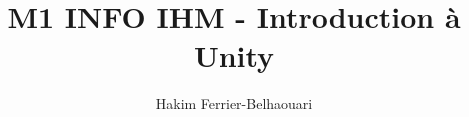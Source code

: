 \documentclass[11pt]{beamer}
\begin{document}
	\author{Hakim Ferrier-Belhaouari}
	\title{M1 INFO IHM - Introduction à Unity}
	\begin{frame}[plain]
		\maketitle
	\end{frame}

	

\end{document}
